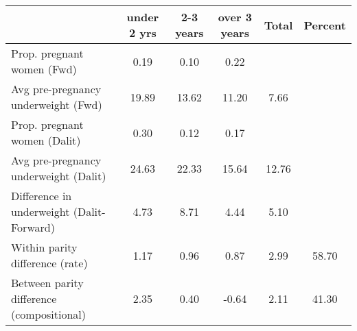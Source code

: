 \begin{tabular}{l*{5}{c}}
\toprule
            &\multicolumn{1}{c}{under 2 yrs}&\multicolumn{1}{c}{2-3 years}&\multicolumn{1}{c}{over 3 years}&\multicolumn{1}{c}{Total}&\multicolumn{1}{c}{Percent}\\
\midrule
\midrule
Prop. pregnant women (Fwd)&        0.19&        0.10&        0.22&            &            \\
Avg pre-pregnancy underweight (Fwd)&       19.89&       13.62&       11.20&        7.66&            \\
Prop. pregnant women (Dalit)&        0.30&        0.12&        0.17&            &            \\
Avg pre-pregnancy underweight (Dalit)&       24.63&       22.33&       15.64&       12.76&            \\
Difference in underweight (Dalit-Forward)&        4.73&        8.71&        4.44&        5.10&            \\
Within parity difference (rate)&        1.17&        0.96&        0.87&        2.99&       58.70\\
Between parity difference (compositional)&        2.35&        0.40&       -0.64&        2.11&       41.30\\
\bottomrule
\end{tabular}
